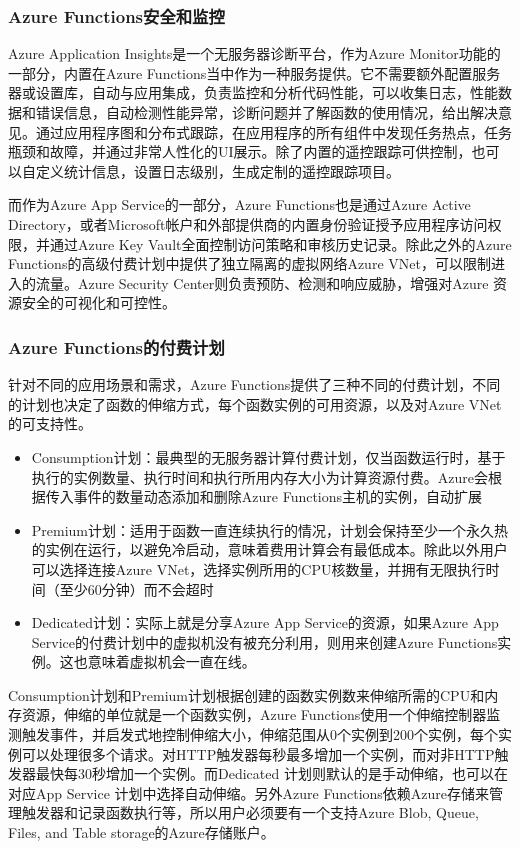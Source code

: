 \documentclass[11pt]{article}
\begin{document}
\subsubsection{Azure Functions安全和监控}
Azure Application Insights是一个无服务器诊断平台，作为Azure Monitor功能的一部分，内置在Azure Functions当中作为一种服务提供。它不需要额外配置服务器或设置库，自动与应用集成，负责监控和分析代码性能，可以收集日志，性能数据和错误信息，自动检测性能异常，诊断问题并了解函数的使用情况，给出解决意见。通过应用程序图和分布式跟踪，在应用程序的所有组件中发现任务热点，任务瓶颈和故障，并通过非常人性化的UI展示。除了内置的遥控跟踪可供控制，也可以自定义统计信息，设置日志级别，生成定制的遥控跟踪项目。

而作为Azure App Service的一部分，Azure Functions也是通过Azure Active Directory，或者Microsoft帐户和外部提供商的内置身份验证授予应用程序访问权限，并通过Azure Key Vault全面控制访问策略和审核历史记录。除此之外的Azure Functions的高级付费计划中提供了独立隔离的虚拟网络Azure VNet，可以限制进入的流量。Azure Security Center则负责预防、检测和响应威胁，增强对Azure 资源安全的可视化和可控性。
\subsubsection{Azure Functions的付费计划}
针对不同的应用场景和需求，Azure Functions提供了三种不同的付费计划，不同的计划也决定了函数的伸缩方式，每个函数实例的可用资源，以及对Azure VNet的可支持性。
\begin{itemize}
	\item Consumption计划：最典型的无服务器计算付费计划，仅当函数运行时，基于执行的实例数量、执行时间和执行所用内存大小为计算资源付费。Azure会根据传入事件的数量动态添加和删除Azure Functions主机的实例，自动扩展
	\item Premium计划：适用于函数一直连续执行的情况，计划会保持至少一个永久热的实例在运行，以避免冷启动，意味着费用计算会有最低成本。除此以外用户可以选择连接Azure VNet，选择实例所用的CPU核数量，并拥有无限执行时间（至少60分钟）而不会超时
	\item Dedicated计划：实际上就是分享Azure App Service的资源，如果Azure App Service的付费计划中的虚拟机没有被充分利用，则用来创建Azure Functions实例。这也意味着虚拟机会一直在线。
\end{itemize}
Consumption计划和Premium计划根据创建的函数实例数来伸缩所需的CPU和内存资源，伸缩的单位就是一个函数实例，Azure Functions使用一个伸缩控制器监测触发事件，并启发式地控制伸缩大小，伸缩范围从0个实例到200个实例，每个实例可以处理很多个请求。对HTTP触发器每秒最多增加一个实例，而对非HTTP触发器最快每30秒增加一个实例。而Dedicated 计划则默认的是手动伸缩，也可以在对应App Service 计划中选择自动伸缩。另外Azure Functions依赖Azure存储来管理触发器和记录函数执行等，所以用户必须要有一个支持Azure Blob, Queue, Files, and Table storage的Azure存储账户。
\end{document}

